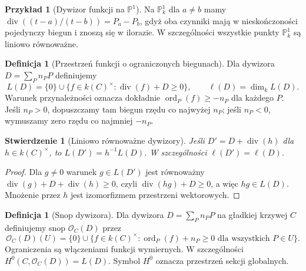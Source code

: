 \documentclass[11pt,a4paper,openany]{report}
\numberwithin{equation}{section}
\theoremstyle{plain}
\newtheorem{stwierdzenie}[twierdzenie]{Stwierdzenie}
\theoremstyle{definition}
\newtheorem{definicja}[twierdzenie]{Definicja}
\newtheorem{przyklad}[twierdzenie]{Przykład}
\theoremstyle{remark}
\newcommand{\PP}{\mathbb P}
\begin{document}
\begin{przyklad}[Dywizor funkcji na $\PP^1$]
Na $\PP^1_k$ dla $a\ne b$ mamy
$\operatorname{div}((t-a)/(t-b))=P_a-P_b$,
gdyż oba czynniki mają w nieskończoności
pojedynczy biegun i znoszą się w ilorazie.
W szczególności wszystkie punkty $\PP^1_k$
są liniowo równoważne.
\end{przyklad}

\begin{definicja}[Przestrzeń funkcji o ograniczonych biegunach]
Dla dywizora $D=\sum_Pn_PP$ definiujemy
\[
 L(D)=\{0\}\cup\{f\in k(C)^\times:
 \operatorname{div}(f)+D\ge0\},\qquad
 \ell(D)=\dim_k L(D).
\]
Warunek przynależności oznacza dokładnie
$\operatorname{ord}_P(f)\ge-n_P$ dla każdego $P$.
Jeśli $n_P>0$, dopuszczamy tam biegun rzędu
co najwyżej $n_P$; jeśli $n_P<0$, wymuszamy
zero rzędu co najmniej $-n_P$.
\end{definicja}

\begin{stwierdzenie}[Liniowo równoważne dywizory]
Jeśli $D'=D+\operatorname{div}(h)$ dla
$h\in k(C)^\times$, to
$L(D')=h^{-1}L(D)$. W szczególności
$\ell(D')=\ell(D)$.
\end{stwierdzenie}
\begin{proof}
Dla $g\ne0$ warunek $g\in L(D')$ jest równoważny
$\operatorname{div}(g)+D+\operatorname{div}(h)\ge0$,
czyli $\operatorname{div}(hg)+D\ge0$, a więc
$hg\in L(D)$. Mnożenie przez $h$ jest
izomorfizmem przestrzeni wektorowych.
\end{proof}

\begin{definicja}[Snop dywizora]
\label{def:O-D}
Dla dywizora $D=\sum_Pn_PP$ na gładkiej krzywej
$C$ definiujemy snop $\mathcal O_C(D)$ przez
\[
 \mathcal O_C(D)(U)=\{0\}\cup\{f\in k(C)^\times:
 \operatorname{ord}_P(f)+n_P\ge0
 \text{ dla wszystkich }P\in U\}.
\]
Ograniczenia są włączeniami funkcji wymiernych.
W szczególności $H^0(C,\mathcal O_C(D))=L(D)$.
Symbol $H^0$ oznacza przestrzeń sekcji globalnych.
\end{definicja}
\end{document}
